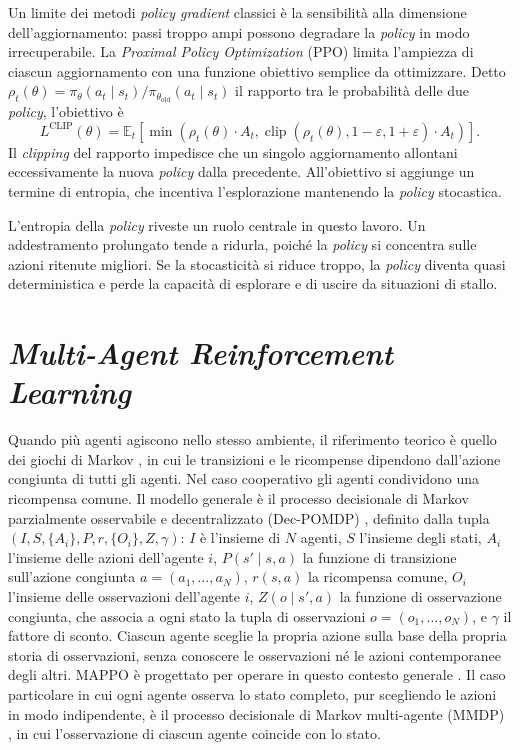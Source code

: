 \documentclass[12pt,a4paper,twoside]{report}
\newcommand{\parencite}[1]{\citep{#1}}
\begin{document}
Un limite dei metodi \emph{policy gradient} classici è la sensibilità alla dimensione dell'aggiornamento: passi troppo ampi possono degradare la \emph{policy} in modo irrecuperabile. La \emph{Proximal Policy Optimization} (PPO) \parencite{schulman2017} limita l'ampiezza di ciascun aggiornamento con una funzione obiettivo semplice da ottimizzare. Detto $\rho_t(\theta) = \pi_\theta(a_t \mid s_t) / \pi_{\theta_{\text{old}}}(a_t \mid s_t)$ il rapporto tra le probabilità delle due \emph{policy}, l'obiettivo è
\[
L^{\text{CLIP}}(\theta) = \mathbb{E}_t \left[ \min\left( \rho_t(\theta) \cdot A_t , \operatorname{clip}(\rho_t(\theta), 1 - \varepsilon, 1 + \varepsilon) \cdot A_t \right) \right].
\]
Il \emph{clipping} del rapporto impedisce che un singolo aggiornamento allontani eccessivamente la nuova \emph{policy} dalla precedente. All'obiettivo si aggiunge un termine di entropia, che incentiva l'esplorazione mantenendo la \emph{policy} stocastica.

L'entropia della \emph{policy} riveste un ruolo centrale in questo lavoro. Un addestramento prolungato tende a ridurla, poiché la \emph{policy} si concentra sulle azioni ritenute migliori. Se la stocasticità si riduce troppo, la \emph{policy} diventa quasi deterministica e perde la capacità di esplorare e di uscire da situazioni di stallo.

\section{\emph{Multi-Agent Reinforcement Learning}}
\label{sec:marl}

Quando più agenti agiscono nello stesso ambiente, il riferimento teorico è quello dei giochi di Markov \parencite{littman1994}, in cui le transizioni e le ricompense dipendono dall'azione congiunta di tutti gli agenti. Nel caso cooperativo gli agenti condividono una ricompensa comune. Il modello generale è il processo decisionale di Markov parzialmente osservabile e decentralizzato (Dec-POMDP) \parencite{oliehoek2016}, definito dalla tupla $(I, S, \{A_i\}, P, r, \{O_i\}, Z, \gamma)$: $I$ è l'insieme di $N$ agenti, $S$ l'insieme degli stati, $A_i$ l'insieme delle azioni dell'agente $i$, $P(s' \mid s, a)$ la funzione di transizione sull'azione congiunta $a = (a_1, \dots, a_N)$, $r(s, a)$ la ricompensa comune, $O_i$ l'insieme delle osservazioni dell'agente $i$, $Z(o \mid s', a)$ la funzione di osservazione congiunta, che associa a ogni stato la tupla di osservazioni $o = (o_1, \dots, o_N)$, e $\gamma$ il fattore di sconto. Ciascun agente sceglie la propria azione sulla base della propria storia di osservazioni, senza conoscere le osservazioni né le azioni contemporanee degli altri. MAPPO è progettato per operare in questo contesto generale \parencite{yu2022}. Il caso particolare in cui ogni agente osserva lo stato completo, pur scegliendo le azioni in modo indipendente, è il processo decisionale di Markov multi-agente (MMDP) \parencite{boutilier1996}, in cui l'osservazione di ciascun agente coincide con lo stato.
\end{document}
